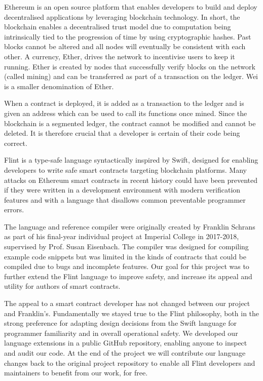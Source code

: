 Ethereum is an open source platform that enables developers to build and deploy decentralised applications by leveraging blockchain technology\cite{bg-ethereum}. In short, the blockchain enables a decentralised trust model due to computation being intrinsically tied to the progression of time by using cryptographic hashes\cite{ptb}. Past blocks cannot be altered and all nodes will eventually be consistent with each other. A currency, Ether, drives the network to incentivise users to keep it running. Ether is created by nodes that successfully verify blocks on the network (called mining) and can be transferred as part of a transaction on the ledger. Wei is a smaller denomination of Ether.

When a contract is deployed, it is added as a transaction to the ledger and is given an address which can be used to call its functions once mined\cite{md-mp}. Since the blockchain is a segmented ledger, the contract cannot be modified and cannot be deleted. It is therefore crucial that a developer is certain of their code being correct\cite{yp}.

Flint is a type-safe language syntactically inspired by Swift, designed for enabling developers to write safe smart contracts targeting blockchain platforms\cite{flint-paper}. Many attacks on Ethereum smart contracts in recent history could have been prevented if they were written in a development environment with modern verification features and with a language that disallows common preventable programmer errors.

The language and reference compiler were originally created by Franklin Schrans as part of his final-year individual project at Imperial College in 2017-2018, supervised by Prof. Susan Eisenbach\cite{flint}. The compiler was designed for compiling example code snippets but was limited in the kinds of contracts that could be compiled due to bugs and incomplete features. Our goal for this project was to further extend the Flint language to improve safety, and increase its appeal and utility for authors of smart contracts.

The appeal to a smart contract developer has not changed between our project and Franklin's. Fundamentally we stayed true to the Flint philosophy, both in the strong preference for adapting design decisions from the Swift language for programmer familiarity and in overall operational safety. We developed our language extensions in a public GitHub repository, enabling anyone to inspect and audit our code. At the end of the project we will contribute our language changes back to the original project repository to enable all Flint developers and maintainers to benefit from our work, for free.
